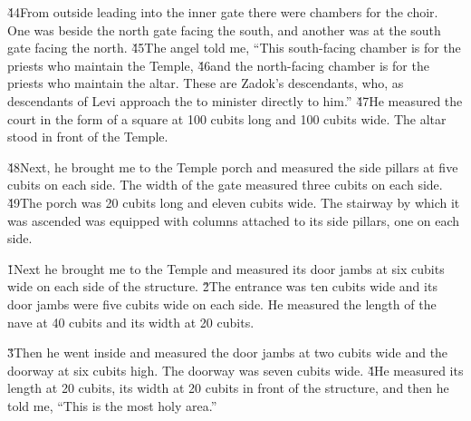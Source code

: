 \v{44}From outside leading into the inner gate there were chambers for the choir. One was beside the north gate facing the south, and another was at the south gate facing the north. \v{45}The angel told me, ``This south-facing chamber is for the priests who maintain the Temple, \v{46}and the north-facing chamber is for the priests who maintain the altar. These are Zadok's descendants, who, as descendants of Levi approach the  to minister directly to him.'' \v{47}He measured the court in the form of a square at 100 cubits long and 100 cubits wide. The altar stood in front of the Temple.

\v{48}Next, he brought me to the Temple porch and measured the side pillars at five cubits on each side. The width of the gate measured three cubits on each side. \v{49}The porch was 20 cubits long and eleven cubits wide. The stairway by which it was ascended was equipped with columns attached to its side pillars, one on each side.

\v{1}Next he brought me to the Temple and measured its door jambs at six cubits wide on each side of the structure. \v{2}The entrance was ten cubits wide and its door jambs were five cubits wide on each side. He measured the length of the nave at 40 cubits and its width at 20 cubits.

\v{3}Then he went inside and measured the door jambs at two cubits wide and the doorway at six cubits high. The doorway was seven cubits wide. \v{4}He measured its length at 20 cubits, its width at 20 cubits in front of the structure, and then he told me, ``This is the most holy area.''

